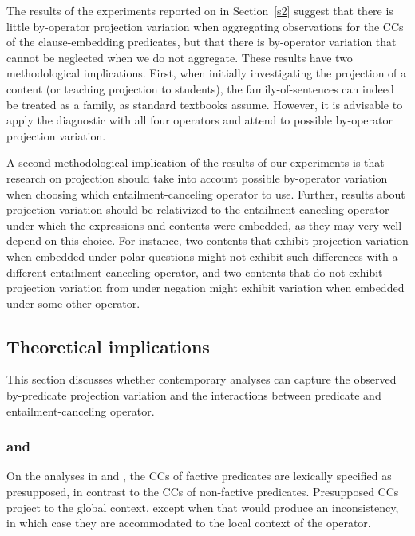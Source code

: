 \documentclass[a4paper,12pt,twoside]{article}
\begin{document}
    The results of the experiments reported on in Section~\ref{s2} suggest that there is little by-operator projection variation when aggregating observations for the CCs of the  clause-embedding predicates, but that there is by-operator variation that cannot be neglected when we do not aggregate. These results have two methodological implications. First, when initially investigating the projection of a content (or teaching projection to students), the family-of-sentences can indeed be treated as a family, as standard textbooks assume. However, it is advisable to apply the diagnostic with all four operators and attend to possible by-operator projection variation. 

	A second methodological implication of the results of our experiments is that research on projection should take into account possible by-operator variation when choosing which entail\-ment-canceling operator to use. Further, results about projection variation should be relativized to the entailment-canceling operator under which the expressions and contents were embedded, as they may very well depend on this choice. For instance, two contents that exhibit projection variation when embedded under polar questions might not exhibit such differences with a different entailment-canceling operator, and two contents that do not exhibit projection variation from under negation might exhibit variation when embedded under some other operator.

\subsection{Theoretical implications}\label{s:analysis}

    This section discusses whether contemporary analyses can capture the observed by-predicate projection variation and the interactions between predicate and entailment-canceling operator.

\subsubsection{\citealt{heim_projection_1983} and \citealt{van_der_sandt_presupposition_1992}}\label{s:heim}

    On the analyses in \citealt{heim_projection_1983} and \citealt{van_der_sandt_presupposition_1992}, the CCs of factive predicates are lexically specified as presupposed, in contrast to the CCs of non-factive predicates. Presupposed CCs project to the global context, except when that would produce an inconsistency, in which case they are accommodated to the local context of the operator.
\end{document}
